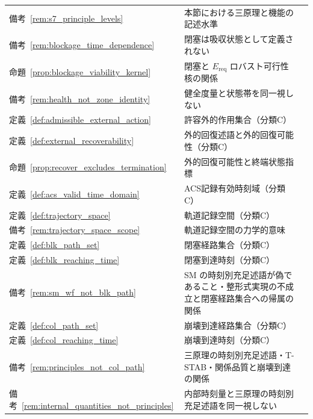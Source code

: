 \begingroup
\small
\setlength{\tabcolsep}{4pt}
\renewcommand{\arraystretch}{1.12}
\begin{longtable}{p{2.4cm} p{10.4cm} r}
備考~\ref{rem:s7_principle_levels} & 本節における三原理と機能の記述水準 & \pageref{rem:s7_principle_levels} \\
備考~\ref{rem:blockage_time_dependence} & 閉塞は吸収状態として定義されない & \pageref{rem:blockage_time_dependence} \\
命題~\ref{prop:blockage_viability_kernel} & 閉塞と $E_{\mathrm{req}}$ ロバスト可行性核の関係 & \pageref{prop:blockage_viability_kernel} \\
備考~\ref{rem:health_not_zone_identity} & 健全度量と状態帯を同一視しない & \pageref{rem:health_not_zone_identity} \\
定義~\ref{def:admissible_external_action} & 許容外的作用集合（分類C） & \pageref{def:admissible_external_action} \\
定義~\ref{def:external_recoverability} & 外的回復述語と外的回復可能性（分類C） & \pageref{def:external_recoverability} \\
命題~\ref{prop:recover_excludes_termination} & 外的回復可能性と終端状態指標 & \pageref{prop:recover_excludes_termination} \\
定義~\ref{def:acs_valid_time_domain} & ACS記録有効時刻域（分類C） & \pageref{def:acs_valid_time_domain} \\
定義~\ref{def:trajectory_space} & 軌道記録空間（分類C） & \pageref{def:trajectory_space} \\
備考~\ref{rem:trajectory_space_scope} & 軌道記録空間の力学的意味 & \pageref{rem:trajectory_space_scope} \\
定義~\ref{def:blk_path_set} & 閉塞経路集合（分類C） & \pageref{def:blk_path_set} \\
定義~\ref{def:blk_reaching_time} & 閉塞到達時刻（分類C） & \pageref{def:blk_reaching_time} \\
備考~\ref{rem:sm_wf_not_blk_path} & SM の時刻別充足述語が偽であること・整形式実現の不成立と閉塞経路集合への帰属の関係 & \pageref{rem:sm_wf_not_blk_path} \\
定義~\ref{def:col_path_set} & 崩壊到達経路集合（分類C） & \pageref{def:col_path_set} \\
定義~\ref{def:col_reaching_time} & 崩壊到達時刻（分類C） & \pageref{def:col_reaching_time} \\
備考~\ref{rem:principles_not_col_path} & 三原理の時刻別充足述語・T-STAB・関係品質と崩壊到達の関係 & \pageref{rem:principles_not_col_path} \\
備考~\ref{rem:internal_quantities_not_principles} & 内部時刻量と三原理の時刻別充足述語を同一視しない & \pageref{rem:internal_quantities_not_principles} \\
\end{longtable}
\endgroup

